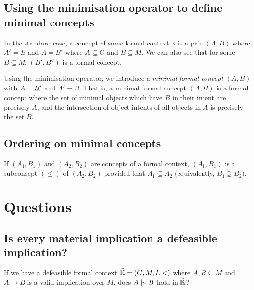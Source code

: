 \documentclass[11pt]{article}
\begin{document}
\subsection{Using the minimisation operator to define minimal concepts}
In the standard case, a concept of some formal context $\mathbb{K}$ is a pair $(A,B)$ where $A' = B$ and $A = B'$ where $A\subseteq G$ and $B\subseteq M$. We can also see that for some $B \subseteq M$, $(B', B'')$ is a formal concept.

Using the minimisation operator, we introduce a \textit{minimal formal concept} $(A,B)$ with $A = \underline{B}'$ and $A' = B$. That is, a minimal formal concept $(A,B)$ is a formal concept where the set of minimal objects which have $B$ in their intent are precisely $A$, and the intersection of object intents of all objects in $A$ is precisely the set $B$.

\subsection{Ordering on minimal concepts}

If $(A_1, B_1)$ and $(A_2, B_2)$ are concepts of a formal context, $(A_1,B_1)$ is a subconcept $(\leq)$ of $(A_2, B_2)$ provided that $A_1 \subseteq A_2$ (equivalently, $B_1 \supseteq B_2)$.

\section{Questions}
\subsection{Is every material implication a defeasible implication?}
If we have a defeasible formal context $\widetilde{\mathbb{K}} = (G,M,I,<)$ where $A,B\subseteq M$ and $A\rightarrow B$ is a valid implication over $M$, does $A \twiddle B$ hold in $\widetilde{\mathbb{K}}$?


\end{document}
